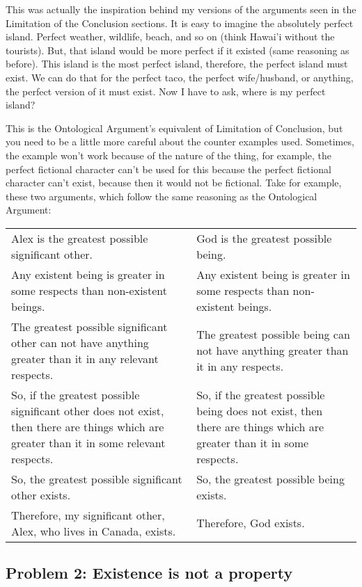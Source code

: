 This was actually the inspiration behind my versions of the arguments seen in the Limitation of the Conclusion sections. It is easy to imagine the absolutely perfect island. Perfect weather, wildlife, beach, and so on (think Hawai’i without the tourists). But, that island would be more perfect if it existed (same reasoning as before). This island is the most perfect island, therefore, the perfect island must exist. We can do that for the perfect taco, the perfect wife/husband, or anything, the perfect version of it must exist. Now I have to ask, where is my perfect island?

This is the Ontological Argument's equivalent of Limitation of Conclusion, but you need to be a little more careful about the counter examples used.  Sometimes, the example won't work because of the nature of the thing, for example, the perfect fictional character can't be used for this because the perfect fictional character can't exist, because then it would not be fictional. Take for example, these two arguments, which follow the same reasoning as the Ontological Argument:
\begin{tabular}{p{2in}|p{2in}}
    Alex is the greatest possible significant other.&God is the greatest possible being.\\
    Any existent being is greater in some respects than non-existent beings.&Any existent being is greater in some respects than non-existent beings.\\
    The greatest possible significant other can not have anything greater than it in any relevant respects.&The greatest possible being can not have anything greater than it in any respects.\\
    So, if the greatest possible significant other does not exist, then there are things which are greater than it in some relevant respects.&So, if the greatest possible being does not exist, then there are things which are greater than it in some respects.\\
    So, the greatest possible significant other exists.&So, the greatest possible being exists.\\
    Therefore, my significant other, Alex, who lives in Canada, exists.&Therefore, God exists.\\
\end{tabular}
 
\subsection{Problem 2: Existence is not a property}

